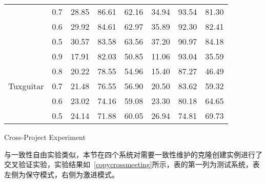\begin{table}[htbp]
\begin{tabular}{cccccccc}
&0.7&	28.85&	86.61&	62.16&	34.94&	93.54&	81.30\\
&0.6&	29.92&	84.61&	62.97&	35.89&	92.30&	82.41\\
&0.5&	30.57&	83.58&	63.56&	37.20&	90.97&	84.18\\
\hline
\multirow{5}{*}{Tuxguitar}
&0.9&	17.91&	82.03&	50.85&	11.06&	93.04&	35.59\\
&0.8&	20.22&	78.55&	54.96&	15.40&	87.27&	46.49\\
&0.7&	21.48&	76.55&	56.90&	20.50&	83.62&	59.32\\
&0.6&	23.02&	74.16&	59.08&	23.30&	80.18&	64.65\\
&0.5&	24.14&	71.88&	60.05&	26.94&	74.81&	69.73\\
\bottomrule[1.5pt]
\end{tabular}
\end{table}


{Cross-Project Experiment}

与一致性自由实验类似，本节在四个系统对需要一致性维护的克隆创建实例进行了交叉验证实验，实验结果如~\ref{copycrossmeeting}所示，表的第一列为测试系统，表左侧为保守模式，右侧为激进模式。


